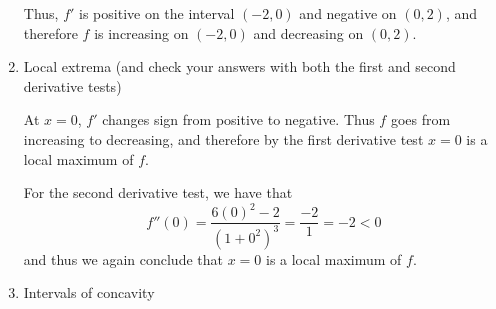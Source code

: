 \documentclass[nooutcomes]{ximera}
\begin{document}
\begin{problem}
\begin{enumerate}
\begin{freeResponse}
		
\begin{center}
\begin{image}
\end{image}
\end{center}


		Thus, $f'$ is positive on the interval $(-2,0)$ and negative on $(0,2)$, and therefore $f$ is increasing on $(-2,0)$ and decreasing on $(0,2)$.  
		\end{freeResponse}
		
	\item  Local extrema (and check your answers with both the first and second derivative tests)
	
		\begin{freeResponse}
		At $x=0$, $f'$ changes sign from positive to negative.  Thus $f$ goes from increasing to decreasing, and therefore by the first derivative test $x=0$ is a local maximum of $f$.  
		
		For the second derivative test, we have that
		$$ f''(0) = \frac{6(0)^2 - 2}{(1+0^2)^3} = \frac{-2}{1} = -2 < 0 $$
		and thus we again conclude that $x=0$ is a local maximum of $f$.
		\end{freeResponse}
		
	\item  Intervals of concavity
	

\end{enumerate}
\end{problem}
\end{document}
